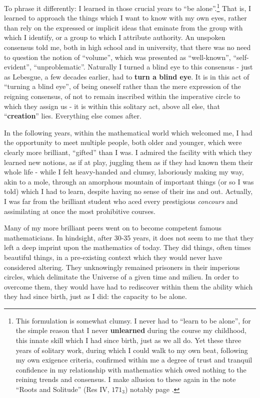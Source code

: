 To phrase it differently: I learned in those crucial years to ``be alone''.\footnote{
This formulation is somewhat clumsy. I never had to ``learn to be alone'', for the simple
reason that I never \textbf{unlearned} during the course my childhood, 
this innate skill which I had since birth, just as we all do. Yet these three years of
solitary work, during which I could walk to my own beat, 
following my own exigence criteria, confirmed within me a degree of trust and tranquil confidence 
in my relationship with mathematics which owed nothing to the reining trends and
consensus. I make allusion to these again in the note ``Roots and Solitude'' 
(Res IV, \no $171_3$) notably page 
.
} That is, I learned to approach the things which I want to know with my own eyes, rather
than rely on the expressed or implicit ideas that eminate from the group with which I
identify, or a group to which I attribute authority.
An unspoken consensus told me, both in high school and in university, that there was no
need to question the notion of ``volume'', which was presented as ``well-known'',
``self-evident'', ``unproblematic''.
Naturally I turned a blind eye to this consensus - just as Lebesgue, a few decades
earlier, had to \textbf{turn a blind eye}.
It is in this act of ``turning a blind eye'', of being oneself rather than the mere
expression of the reigning consensus, of not to remain inscribed within the imperative
circle to which they assign us - it is within this solitary act, above all else, that
``\textbf{creation}'' lies. Everything else comes after.

In the following years, within the mathematical world which welcomed me, I had the opportunity 
to meet multiple people, both older and younger, which were clearly more brilliant,
``gifted'' than I was. I admired the facility with which they learned new notions, as if
at play, juggling them as if they had known them their whole life - while I felt
heavy-handed and clumsy, laboriously making my way, akin to a mole, through an amorphous
mountain of important things (or so I was told) which I had to learn, despite having no
sense of their ins and out. Actually, I was far from the brilliant student who aced every prestigious
\emph{concours} and assimilating at once the most prohibitive courses.

Many of my more brilliant peers went on to become competent famous mathematicians. In
hindsight, after 30-35 years, it does not seem to me that they left a deep imprint
upon the mathematics of today. 
They did things, often times beautiful things, in a pre-existing context which they would
never have considered altering.
They unknowingly remained prisoners in their imperious circles, which
delimitate the Universe of 
a given time and milieu. In order to overcome them, they would have had to rediscover
within them the ability which they had since birth, just as I did: the capacity to be
alone. 

